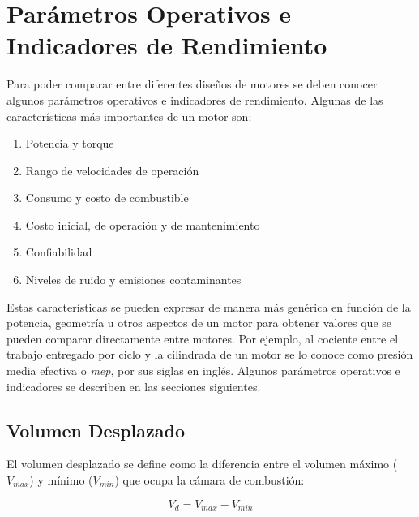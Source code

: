 

\section{Parámetros Operativos e Indicadores de Rendimiento}
%
Para poder comparar entre diferentes diseños de motores se deben conocer algunos
parámetros operativos e indicadores de rendimiento.
%
Algunas de las características más importantes de un motor son:
%
\begin{enumerate}
    \item Potencia y torque
    \item Rango de velocidades de operación
    \item Consumo y costo de combustible
    \item Costo inicial, de operación y de mantenimiento
    \item Confiabilidad
    \item Niveles de ruido y emisiones contaminantes
\end{enumerate}

Estas características se pueden expresar de manera más genérica en función de la
potencia, geometría u otros aspectos de un motor para obtener valores que se
pueden comparar directamente entre motores.
%
Por ejemplo, al cociente entre el trabajo entregado por ciclo y la cilindrada
de un motor se lo conoce como presión media efectiva o \emph{mep}, por sus
siglas en inglés.
%
Algunos parámetros operativos e indicadores se describen en las secciones
siguientes.


\subsection{Volumen Desplazado}
%
El volumen desplazado se define como la diferencia entre el volumen máximo
($V_{max}$) y mínimo ($V_{min}$) que ocupa la cámara de combustión:

\begin{equation}\label{eq:vol_desp} V_d = V_{max}-V_{min}
\end{equation}
%


